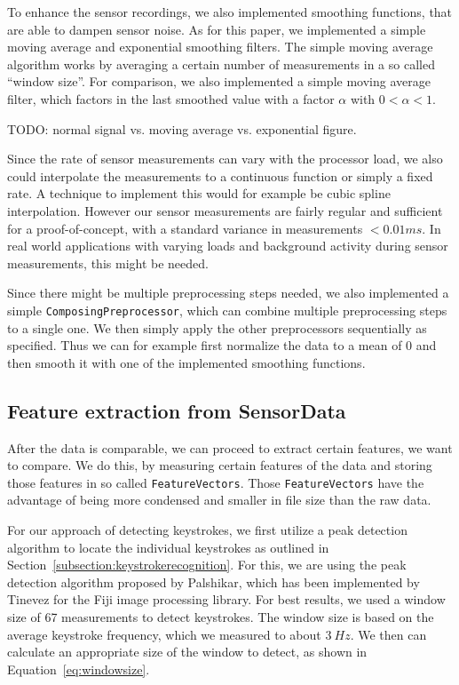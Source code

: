 To enhance the sensor recordings, we also implemented smoothing functions, that are able to dampen sensor noise. As for this paper, we implemented a simple moving average and exponential smoothing filters. The simple moving average algorithm works by averaging a certain number of measurements in a so called ``window size''. For comparison, we also implemented a simple moving average filter, which factors in the last smoothed value with a factor $\alpha$ with $0 < \alpha < 1$.

TODO: normal signal vs. moving average vs. exponential figure.

Since the rate of sensor measurements can vary with the processor load, we also could interpolate the measurements to a continuous function or simply a fixed rate. A technique to implement this would for example be cubic spline interpolation. However our sensor measurements are fairly regular and sufficient for a proof-of-concept, with a standard variance in measurements $< 0.01ms$. In real world applications with varying loads and background activity during sensor measurements, this might be needed.

Since there might be multiple preprocessing steps needed, we also implemented a simple \lstinline$ComposingPreprocessor$, which can combine multiple preprocessing steps to a single one. We then simply apply the other preprocessors sequentially as specified. Thus we can for example first normalize the data to a mean of 0 and then smooth it with one of the implemented smoothing functions.

\subsection{Feature extraction from SensorData}\label{subsection:featureextraction}
After the data is comparable, we can proceed to extract certain features, we want to compare. We do this, by measuring certain features of the data and storing those features in so called \lstinline$FeatureVectors$. Those \lstinline$FeatureVectors$ have the advantage of being more condensed and smaller in file size than the raw data.

For our approach of detecting keystrokes, we first utilize a peak detection algorithm to locate the individual keystrokes as outlined in Section~\ref{subsection:keystrokerecognition}. For this, we are using the peak detection algorithm proposed by Palshikar, which has been implemented by Tinevez for the Fiji image processing library\cite{palshikar2009simple, tinevez2011peak}. For best results, we used a window size of 67 measurements to detect keystrokes. The window size is based on the average keystroke frequency, which we measured to about $\SI{3}{Hz}$. We then can calculate an appropriate size of the window to detect, as shown in Equation~\ref{eq:windowsize}.

